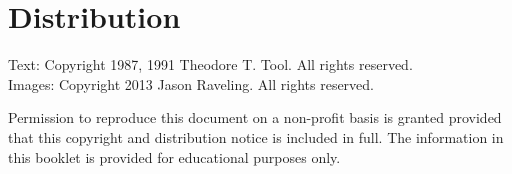 \section*{Distribution}
Text: Copyright 1987, 1991 Theodore T. Tool. All rights reserved.\\
Images: Copyright 2013 Jason Raveling. All rights reserved.

Permission to reproduce this document on a non-profit basis is granted provided that this copyright and distribution notice is included in full.
The information in this booklet is provided for educational purposes only.

